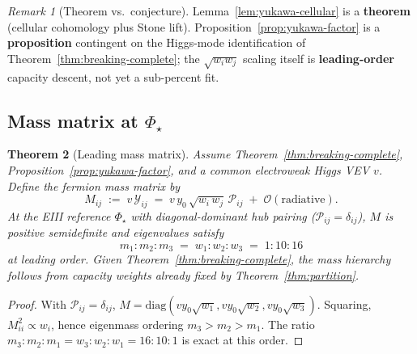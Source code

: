 \documentclass[aps,prd,onecolumn,amsmath,amssymb,nofootinbib,11pt]{revtex4-2}
\numberwithin{equation}{section}
\theoremstyle{plain}
\newtheorem{theorem}{Theorem}[section]
\theoremstyle{definition}
\theoremstyle{remark}
\newtheorem{remark}[theorem]{Remark}
\newcommand{\orderparam}{\Phi}
\begin{document}
\begin{remark}[Theorem vs.\ conjecture]
Lemma~\ref{lem:yukawa-cellular} is a \textbf{theorem} (cellular cohomology
plus Stone lift). Proposition~\ref{prop:yukawa-factor} is a
\textbf{proposition} contingent on the Higgs-mode identification of
Theorem~\ref{thm:breaking-complete}; the $\sqrt{w_i w_j}$ scaling itself is
\textbf{leading-order} capacity descent, not yet a sub-percent fit.
\end{remark}

\subsection{Mass matrix at $\orderparam_\star$}
\label{sec:yukawa:mass-matrix}

\begin{theorem}[Leading mass matrix]\label{thm:yukawa-mass}
Assume Theorem~\ref{thm:breaking-complete}, Proposition~\ref{prop:yukawa-factor},
and a common electroweak Higgs VEV $v$. Define the fermion mass matrix by
\begin{equation}\label{eq:mass-matrix-def}
  M_{ij}
  \;:=\;
  v\,\mathcal{Y}_{ij}
  \;=\;
  v\,y_0\,\sqrt{w_i\,w_j}\,\mathcal{P}_{ij}
  \;+\;\mathcal{O}(\text{radiative}).
\end{equation}
At the EIII reference $\orderparam_\star$ with diagonal-dominant hub pairing
($\mathcal{P}_{ij}=\delta_{ij}$), $M$ is positive semidefinite and
eigenvalues satisfy
\begin{equation}\label{eq:mass-eigenvalues}
  m_1:m_2:m_3 \;=\; w_1:w_2:w_3 \;=\; 1:10:16
\end{equation}
at leading order. Given Theorem~\ref{thm:breaking-complete}, the mass hierarchy
follows from capacity weights already fixed by Theorem~\ref{thm:partition}.
\end{theorem}

\begin{proof}
With $\mathcal{P}_{ij}=\delta_{ij}$, $M=\mathrm{diag}(v y_0\sqrt{w_1},
v y_0\sqrt{w_2}, v y_0\sqrt{w_3})$. Squaring,
$M_{ii}^2\propto w_i$, hence eigenmass ordering $m_3>m_2>m_1$. The ratio
$m_3:m_2:m_1=w_3:w_2:w_1=16:10:1$ is exact at this order.
\end{proof}
\end{document}
